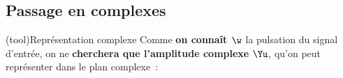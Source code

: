 \documentclass[../../main/main.tex]{subfiles}
\begin{document}

\subsection{Passage en complexes}
\begin{tcb*}[sidebyside, righthand ratio=.4](tool){Représentation complexe}
	Comme \textbf{on connaît $\w$} la pulsation du signal d'entrée, on ne
	\textbf{cherchera que l'amplitude complexe} $\Yu$, qu'on peut représenter
	dans le plan complexe~:
	\tcblower
	\begin{center}
\end{center}
\end{tcb*}
\end{document}
